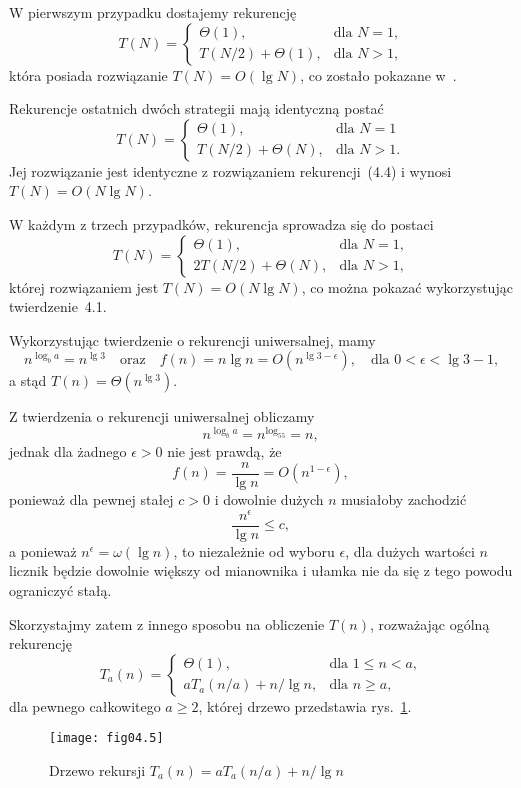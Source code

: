 
\subexercise{} %
W pierwszym przypadku dostajemy rekurencję
\[
	T(N) = \begin{cases}
		\Theta(1), & \text{dla $N=1$,} \\
		T(N/2)+\Theta(1), & \text{dla $N>1$,}
	\end{cases}
\]
która posiada rozwiązanie $T(N)=O(\lg N)$, co zostało pokazane w~.

\medskip
\noindent Rekurencje ostatnich dwóch strategii mają identyczną postać
\[
	T(N) = \begin{cases}
		\Theta(1), & \text{dla $N=1$} \\
		T(N/2)+\Theta(N), & \text{dla $N>1$.}
	\end{cases}
\]
Jej rozwiązanie jest identyczne z rozwiązaniem rekurencji~(4.4) i wynosi $T(N)=O(N\lg N)$.

\subexercise{} %
W każdym z trzech przypadków, rekurencja sprowadza się do postaci
\[
	T(N) = \begin{cases}
		\Theta(1), & \text{dla $N=1$,} \\
		2T(N/2)+\Theta(N), & \text{dla $N>1$,}
	\end{cases}
\]
której rozwiązaniem jest $T(N)=O(N\lg N)$, co można pokazać wykorzystując twierdzenie~4.1.


\subexercise{} %
Wykorzystując twierdzenie o rekurencji uniwersalnej, mamy
\[
	n^{\log_ba} = n^{\lg3} \quad\text{oraz}\quad f(n) = n\lg n = O(n^{\lg3-\epsilon}), \quad\text{dla $0<\epsilon<\lg3-1$,}
\]
a stąd $T(n)=\Theta(n^{\lg3})$.

\subexercise{} %
Z twierdzenia o rekurencji uniwersalnej obliczamy
\[
	n^{\log_ba} = n^{\log_55} = n,
\]
jednak dla żadnego $\epsilon>0$ nie jest prawdą, że
\[
	f(n) = \frac{n}{\lg n} = O(n^{1-\epsilon}),
\]
ponieważ dla pewnej stałej $c>0$ i dowolnie dużych $n$ musiałoby zachodzić
\[
	\frac{n^\epsilon}{\lg n} \le c,
\]
a ponieważ $n^\epsilon=\omega(\lg n)$, to niezależnie od wyboru $\epsilon$, dla dużych wartości $n$ licznik będzie dowolnie większy od mianownika i ułamka nie da się z tego powodu ograniczyć stałą.

Skorzystajmy zatem z innego sposobu na obliczenie $T(n)$, rozważając ogólną rekurencję
\[
	T_a(n) = \begin{cases}
		\Theta(1), & \text{dla $1\le n<a$,} \\
		aT_a(n/a)+n/\!\lg n, & \text{dla $n\ge a$,}
	\end{cases}
\]
dla pewnego całkowitego $a\ge2$, której drzewo przedstawia rys.~\ref{fig:4-4b}.
\begin{figure}[ht]
	\begin{center}
		\texttt{[image: fig04.5]}
	\end{center}
	\caption{Drzewo rekursji $T_a(n)=aT_a(n/a)+n/\!\lg n$} \label{fig:4-4b}
\end{figure}

